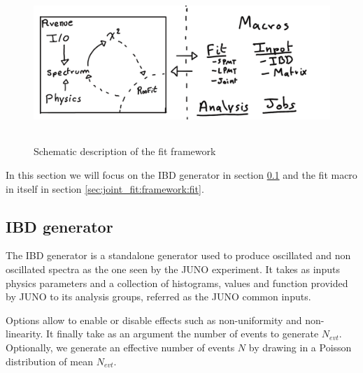 \documentclass[../main.tex]{subfiles}
\begin{document}
\begin{figure}[ht]
  \centering
  \includegraphics[height=6cm]{images/joint_fit/fit_framework.png}
  \caption{Schematic description of the fit framework}
  \label{fig:joint_fit:framework}
\end{figure}

In this section we will focus on the IBD generator in section \ref{sec:joint_fit:framework:ibd-gen} and the fit macro in itself in section \ref{sec:joint_fit:framework:fit}.
%
%
%
%
\subsection{IBD generator}
\label{sec:joint_fit:framework:ibd-gen}

The IBD generator is a standalone generator used to produce oscillated and non oscillated spectra as the one seen by the JUNO experiment. It takes as inputs physics parameters and a collection of histograms, values and function provided by JUNO to its analysis groups, referred as the JUNO common inputs.

Options allow to enable or disable effects such as non-uniformity and non-linearity. It finally take as an argument the number of events to generate $N_{evt}$. Optionally, we generate an effective number of events $N$ by drawing in a Poisson distribution of mean $N_{evt}$.
\end{document}
